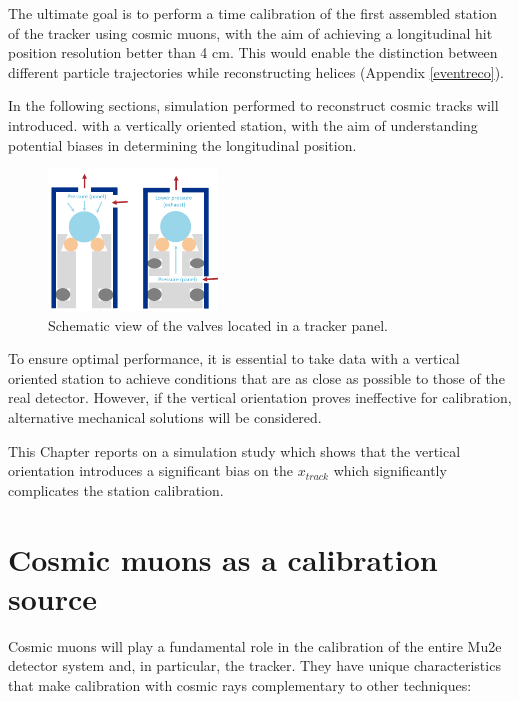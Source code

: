 The ultimate goal is to perform a time calibration of 
the first assembled station of the tracker using 
cosmic muons, with the aim of achieving a longitudinal hit 
position resolution better than 4 cm. This would enable the distinction 
between different particle trajectories while reconstructing helices (Appendix \ref{eventreco}).

In the following sections, simulation performed to reconstruct cosmic tracks will introduced. 
with a vertically oriented station, with the aim of understanding 
potential biases in determining the longitudinal position.

\begin{figure}[!h]
    \centering
    \includegraphics[width =0.4\textwidth]{figures/png/gassystem.png}
    \caption[Schematic view of the valves located in a tracker panel.]{Schematic view of the valves located in a tracker panel.}
    \label{fig:gassystem}
\end{figure}
To ensure optimal performance, it is essential to take data with a vertical oriented station 
to achieve conditions that are as close as possible to those of the real detector. 
However, if the vertical orientation proves ineffective for calibration, 
alternative mechanical solutions will be considered.

This Chapter reports on a simulation study 
which shows that the vertical orientation introduces a significant bias on 
the $x_{track}$ which significantly complicates 
the station calibration. 



\section{Cosmic muons as a calibration source}
Cosmic muons will play a fundamental role in the 
calibration of the entire Mu2e detector system and, 
in particular, the tracker. They have unique 
characteristics that make calibration with cosmic rays 
complementary to other techniques:

 

